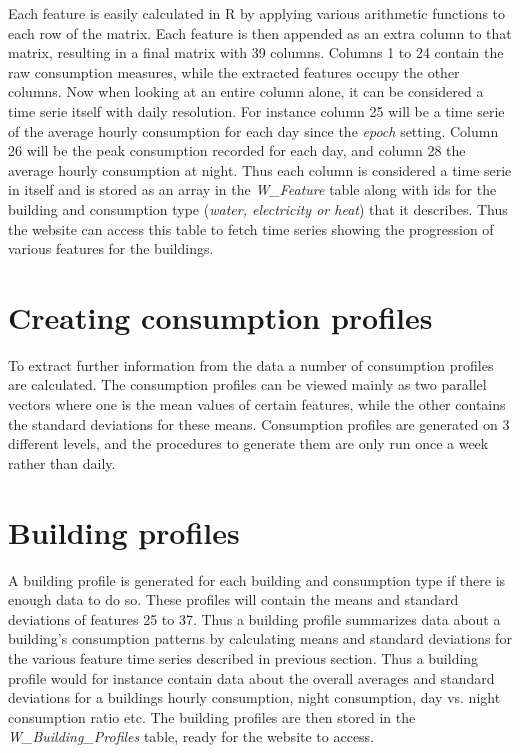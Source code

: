 Each feature is easily calculated in R by applying various arithmetic functions to each row of the matrix. Each feature is then appended as an extra column to that matrix, resulting in a final matrix with 39 columns. Columns 1 to 24 contain the raw consumption measures, while the extracted features occupy the other columns.
Now when looking at an entire column alone, it can be considered a time serie itself with daily resolution. For instance column 25 will be a time serie of the average hourly consumption for each day since the \emph{epoch} setting. Column 26 will be the peak consumption recorded for each day, and column 28 the average hourly consumption at night. Thus each column is considered a time serie in itself and is stored as an array in the \emph{W\_Feature} table along with ids for the building and consumption type (\emph{water, electricity or heat}) that it describes. Thus the website can access this table to fetch time series showing the progression of various features for the buildings.
\section{Creating consumption profiles}
To extract further information from the data a number of consumption profiles are calculated. The consumption profiles can be viewed mainly as two parallel vectors where one is the mean values of certain features, while the other contains the standard deviations for these means. Consumption profiles are generated on 3 different levels, and the procedures to generate them are only run once a week rather than daily. 
\section*{Building profiles}
A building profile is generated for each building and consumption type if there is enough data to do so. These profiles will contain the means and standard deviations of features 25 to 37. Thus a building profile summarizes data about a building's consumption patterns by calculating means and standard deviations for the various feature time series described in previous section. Thus a building profile would for instance contain data about the overall averages and standard deviations for a buildings hourly consumption, night consumption, day vs. night consumption ratio etc. The building profiles are then stored in the \emph{W\_Building\_Profiles} table, ready for the website to access.
